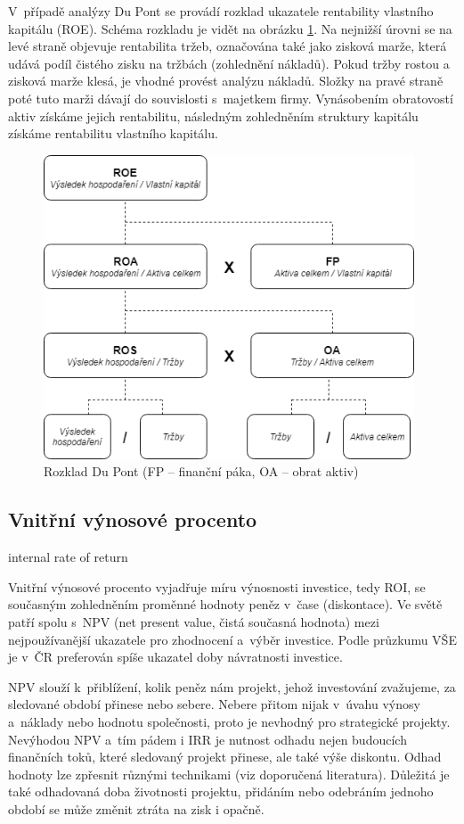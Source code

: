 V~případě analýzy Du Pont se provádí rozklad ukazatele rentability vlastního kapitálu (ROE). Schéma rozkladu je vidět na obrázku \ref{dupont}. Na nejnižší úrovni se na levé straně objevuje rentabilita tržeb, označována také jako zisková marže, která udává podíl čistého zisku na tržbách (zohlednění nákladů). Pokud tržby rostou a zisková marže klesá, je vhodné provést analýzu nákladů. Složky na pravé straně poté tuto marži dávají do souvislosti s~majetkem firmy. Vynásobením obratovostí aktiv získáme jejich rentabilitu, následným zohledněním struktury kapitálu získáme rentabilitu vlastního kapitálu.

\begin{figure}
  \centering
  \includegraphics[width=11cm]{img/dupont.png}
  \caption{Rozklad Du Pont \cite{ruck} (FP -- finanční páka, OA -- obrat aktiv)}
  \label{dupont}
\end{figure}

\subsection{Vnitřní výnosové procento}
\label{vvp}
internal rate of return

Vnitřní výnosové procento vyjadřuje míru výnosnosti investice, tedy ROI, se současným zohledněním proměnné hodnoty peněz v~čase (diskontace). Ve světě patří spolu s~NPV (net present value, čistá současná hodnota) mezi nejpoužívanější ukazatele pro zhodnocení a~výběr investice. Podle průzkumu VŠE je v~ČR preferován spíše ukazatel doby návratnosti investice.\cite{businessvize_irr}

NPV slouží k~přiblížení, kolik peněz nám projekt, jehož investování zvažujeme, za sledované období přinese nebo sebere. Nebere přitom nijak v~úvahu výnosy a~náklady nebo hodnotu společnosti, proto je nevhodný pro strategické projekty. Nevýhodou NPV a~tím pádem i IRR je nutnost odhadu nejen budoucích finančních toků, které sledovaný projekt přinese, ale také výše diskontu. Odhad hodnoty lze zpřesnit různými technikami (viz doporučená literatura). Důležitá je také odhadovaná doba životnosti projektu, přidáním nebo odebráním jednoho období se může změnit ztráta na zisk i opačně.


